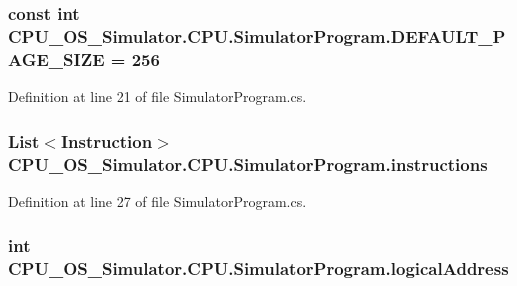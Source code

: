 \subsubsection[{D\+E\+F\+A\+U\+L\+T\+\_\+\+P\+A\+G\+E\+\_\+\+S\+I\+Z\+E}]{\setlength{\rightskip}{0pt plus 5cm}const int C\+P\+U\+\_\+\+O\+S\+\_\+\+Simulator.\+C\+P\+U.\+Simulator\+Program.\+D\+E\+F\+A\+U\+L\+T\+\_\+\+P\+A\+G\+E\+\_\+\+S\+I\+Z\+E = 256\hspace{0.3cm}{\ttfamily [private]}}\label{class_c_p_u___o_s___simulator_1_1_c_p_u_1_1_simulator_program_ad43b4a6e2b20d2097ef7ba885dfa4249}


Definition at line 21 of file Simulator\+Program.\+cs.

\hypertarget{class_c_p_u___o_s___simulator_1_1_c_p_u_1_1_simulator_program_a30b501e0b2d012212077059be49857cf}{}
\subsubsection[{instructions}]{\setlength{\rightskip}{0pt plus 5cm}List$<${\bf Instruction}$>$ C\+P\+U\+\_\+\+O\+S\+\_\+\+Simulator.\+C\+P\+U.\+Simulator\+Program.\+instructions\hspace{0.3cm}{\ttfamily [private]}}\label{class_c_p_u___o_s___simulator_1_1_c_p_u_1_1_simulator_program_a30b501e0b2d012212077059be49857cf}


Definition at line 27 of file Simulator\+Program.\+cs.

\hypertarget{class_c_p_u___o_s___simulator_1_1_c_p_u_1_1_simulator_program_a4d5ae08fcd223ce00d95588b8761d09c}{}
\subsubsection[{logical\+Address}]{\setlength{\rightskip}{0pt plus 5cm}int C\+P\+U\+\_\+\+O\+S\+\_\+\+Simulator.\+C\+P\+U.\+Simulator\+Program.\+logical\+Address\hspace{0.3cm}{\ttfamily [private]}}\label{class_c_p_u___o_s___simulator_1_1_c_p_u_1_1_simulator_program_a4d5ae08fcd223ce00d95588b8761d09c}


